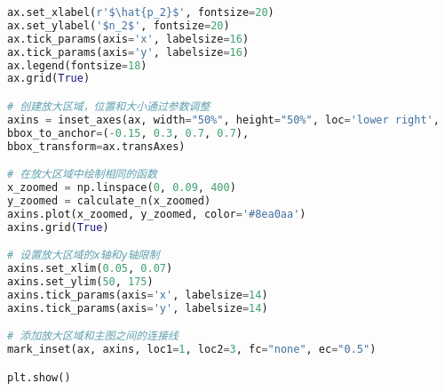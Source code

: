 \documentclass[withoutpreface,bwprint]{cumcmthesis} %
\begin{document}
\begin{lstlisting}[language=python]
ax.set_xlabel(r'$\hat{p_2}$', fontsize=20)
ax.set_ylabel('$n_2$', fontsize=20)
ax.tick_params(axis='x', labelsize=16)
ax.tick_params(axis='y', labelsize=16)
ax.legend(fontsize=18)
ax.grid(True)

# 创建放大区域，位置和大小通过参数调整
axins = inset_axes(ax, width="50%", height="50%", loc='lower right',
bbox_to_anchor=(-0.15, 0.3, 0.7, 0.7),
bbox_transform=ax.transAxes)

# 在放大区域中绘制相同的函数
x_zoomed = np.linspace(0, 0.09, 400)
y_zoomed = calculate_n(x_zoomed)
axins.plot(x_zoomed, y_zoomed, color='#8ea0aa')
axins.grid(True)

# 设置放大区域的x轴和y轴限制
axins.set_xlim(0.05, 0.07)
axins.set_ylim(50, 175)
axins.tick_params(axis='x', labelsize=14)
axins.tick_params(axis='y', labelsize=14)

# 添加放大区域和主图之间的连接线
mark_inset(ax, axins, loc1=1, loc2=3, fc="none", ec="0.5")

plt.show()
 \end{lstlisting}
 
\end{document}
